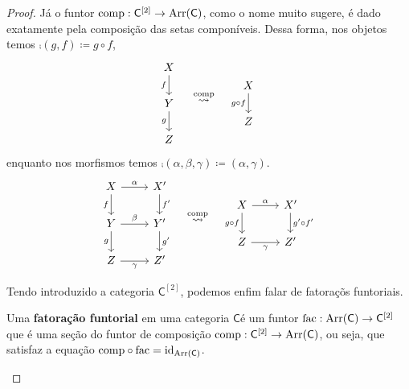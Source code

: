 \begin{proof}
  Já o funtor $\mathrm{comp}: \mathsf{C}^{[2]} \to \mathrm{Arr}(\mathsf{C})$, como o nome muito sugere, é dado exatamente pela composição das setas componíveis.
  Dessa forma, nos objetos temos $\comp(g,f) \coloneqq g \circ f$,
  \begin{displaymath}
    \begin{tikzcd}
      X
      \arrow[d, "f" swap]
      \\ Y
      \arrow[d, "g" swap]
      \\ Z
    \end{tikzcd}
    \quad \overset{\comp}{\rightsquigarrow} \quad
    \begin{tikzcd}
      X
      \arrow[d, "g \circ f" swap]
      \\ Z
    \end{tikzcd}
  \end{displaymath}
  enquanto nos morfismos temos $\comp(\alpha,\beta,\gamma) \coloneqq (\alpha,\gamma)$.
  \begin{displaymath}
    \begin{tikzcd}
      X
      \arrow[d, "f" swap]
      \arrow[r, "\alpha"]
      & X'
      \arrow[d, "f'"]
      \\ Y
      \arrow[d, "g" swap]
      \arrow[r, "\beta"]
      & Y'
      \arrow[d, "g'"]
      \\ Z
      \arrow[r, "\gamma" swap]
      & Z'
    \end{tikzcd}
    \quad \overset{\comp}{\rightsquigarrow} \quad
    \begin{tikzcd}
      X
      \arrow[d, "g \circ f" swap]
      \arrow[r, "\alpha"]
      & X'
      \arrow[d, "g' \circ f'"]
      \\ Z
      \arrow[r, "\gamma" swap]
      & Z'
    \end{tikzcd}
  \end{displaymath}
  
  Tendo introduzido a categoria $\mathsf{C}^{[2]}$, podemos enfim falar de fatoraçõs funtoriais.
  
  \begin{defin}\label{defin:fatoracao_funtorial}
    Uma \textbf{fatoração funtorial} em uma categoria $\mathsf{C}$é  um funtor $\mathrm{fac}: \mathrm{Arr}(\mathsf{C}) \to \mathsf{C}^{[2]}$ que é uma seção do funtor de composição $\mathrm{comp}: \mathsf{C}^{[2]} \to \mathrm{Arr}(\mathsf{C})$, ou seja, que satisfaz a equação $\mathrm{comp} \circ \mathrm{fac} = \mathrm{id}_{\mathsf{\mathrm{Arr}(\mathsf{C})}}$.
  \end{defin}
  

\end{proof}
